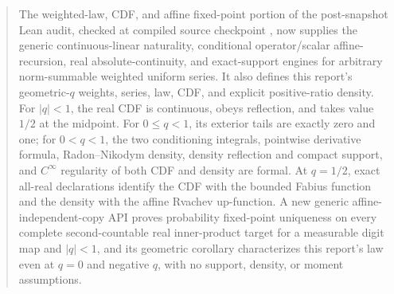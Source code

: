 \documentclass[11pt]{article}
\numberwithin{equation}{section}
\theoremstyle{definition}
\theoremstyle{remark}
\begin{document}
\begin{abstract}
\pagebreak[4]
The weighted-law, CDF, and affine fixed-point portion of the post-snapshot Lean audit,
checked at compiled source checkpoint
, now supplies the generic continuous-linear naturality,
conditional operator/scalar affine-recursion, real absolute-continuity, and exact-support
engines for arbitrary norm-summable weighted uniform series.  It also defines this report's
geometric-\(q\) weights, series, law, CDF, and explicit positive-ratio density.  For
\(|q|<1\), the real CDF is continuous, obeys reflection, and takes value \(1/2\) at the
midpoint.  For \(0\le q<1\), its exterior tails are exactly zero and one; for \(0<q<1\),
the two conditioning integrals, pointwise derivative formula, Radon--Nikodym density,
density reflection and compact support, and \(C^\infty\) regularity of both CDF and density
are formal.  At \(q=1/2\), exact all-real declarations identify the CDF with the bounded
Fabius function and the density with the affine Rvachev up-function.  A new generic
affine-independent-copy API proves probability fixed-point uniqueness on every complete
second-countable real inner-product target for a measurable digit map and \(|q|<1\), and its
geometric corollary characterizes this report's law even at \(q=0\) and negative \(q\), with
no support, density, or moment assumptions.


\end{abstract}
\end{document}
